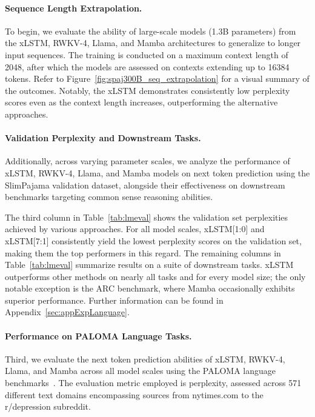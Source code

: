 \paragraph{Sequence Length Extrapolation.}
\label{sec:spaj300B_ctx_extrapolation}
To begin, we evaluate the ability of large-scale models (1.3B parameters) from the xLSTM, RWKV-4, Llama, and Mamba architectures to generalize to longer input sequences. The training is conducted on a maximum context length of 2048, after which the models are assessed on contexts extending up to 16384 tokens. Refer to Figure~\ref{fig:spaj300B_seq_extrapolation} for a visual summary of the outcomes. Notably, the xLSTM demonstrates consistently low perplexity scores even as the context length increases, outperforming the alternative approaches.

\paragraph{Validation Perplexity and Downstream Tasks.}
\label{sec:spaj_downstream_eval}
Additionally, across varying parameter scales, we analyze the performance of xLSTM, RWKV-4, Llama, and Mamba models on next token prediction using the SlimPajama validation dataset, alongside their effectiveness on downstream benchmarks targeting common sense reasoning abilities.

The third column in Table~\ref{tab:lmeval} shows the validation set perplexities achieved by various approaches. For all model scales, xLSTM[1:0] and xLSTM[7:1] consistently yield the lowest perplexity scores on the validation set, making them the top performers in this regard. The remaining columns in Table~\ref{tab:lmeval} summarize results on a suite of downstream tasks. xLSTM outperforms other methods on nearly all tasks and for every model size; the only notable exception is the ARC benchmark, where Mamba occasionally exhibits superior performance. Further information can be found in Appendix~\ref{sec:appExpLanguage}.

\paragraph{Performance on PALOMA Language Tasks.} Third, we evaluate the next token prediction abilities of xLSTM, RWKV-4, Llama, and Mamba across all model scales using the PALOMA language benchmarks~\citep{Magnusson:23arxivshort}. The evaluation metric employed is perplexity, assessed across 571 different text domains encompassing sources from nytimes.com to the r/depression subreddit.

